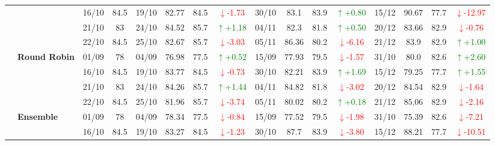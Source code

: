 {\begin{longtable}{llcc|cccc|cccc|cccc}
&
& 16/10 & 84.5 & 19/10 & 82.77 & 84.5 & \textcolor{red}{\(\downarrow\)-1.73} & 30/10 & 83.1 & 83.9 & \textcolor{green}{\(\uparrow\)+0.80} & 15/12 & 90.67 & 77.7 & \textcolor{red}{\(\downarrow\)-12.97} \\

&
& 21/10 & 83 & 24/10 & 84.52 & 85.7 & \textcolor{green}{\(\uparrow\)+1.18} & 04/11 & 82.3 & 81.8 & \textcolor{green}{\(\uparrow\)+0.50} & 20/12 & 83.66 & 82.9 & \textcolor{red}{\(\downarrow\)-0.76} \\

&
& 22/10 & 84.5 & 25/10 & 82.67 & 85.7 & \textcolor{red}{\(\downarrow\)-3.03} & 05/11 & 86.36 & 80.2 & \textcolor{red}{\(\downarrow\)-6.16} & 21/12 & 83.9 & 82.9 & \textcolor{green}{\(\uparrow\)+1.00} \\
\cmidrule(lr){2-16}


& \textbf{Round Robin}
& 01/09 & 78 & 04/09 & 76.98 & 77.5 & \textcolor{green}{\(\uparrow\)+0.52} & 15/09 & 77.93 & 79.5 & \textcolor{red}{\(\downarrow\)-1.57} & 31/10 & 80.0 & 82.6 & \textcolor{green}{\(\uparrow\)+2.60} \\

&
& 16/10 & 84.5 & 19/10 & 83.77 & 84.5 & \textcolor{red}{\(\downarrow\)-0.73} & 30/10 & 82.21 & 83.9 & \textcolor{green}{\(\uparrow\)+1.69} & 15/12 & 79.25 & 77.7 & \textcolor{green}{\(\uparrow\)+1.55} \\

&
& 21/10 & 83 & 24/10 & 84.26 & 85.7 & \textcolor{green}{\(\uparrow\)+1.44} & 04/11 & 84.82 & 81.8 & \textcolor{red}{\(\downarrow\)-3.02} & 20/12 & 84.54 & 82.9 & \textcolor{red}{\(\downarrow\)-1.64} \\

&
& 22/10 & 84.5 & 25/10 & 81.96 & 85.7 & \textcolor{red}{\(\downarrow\)-3.74} & 05/11 & 80.02 & 80.2 & \textcolor{green}{\(\uparrow\)+0.18} & 21/12 & 85.06 & 82.9 & \textcolor{red}{\(\downarrow\)-2.16} \\
\cmidrule(lr){2-16}




& \textbf{Ensemble}
& 01/09 & 78 & 04/09 & 78.34 & 77.5 & \textcolor{red}{\(\downarrow\)-0.84} & 15/09 & 77.52 & 79.5 & \textcolor{red}{\(\downarrow\)-1.98} & 31/10 & 75.39 & 82.6 & \textcolor{red}{\(\downarrow\)-7.21} \\

&
& 16/10 & 84.5 & 19/10 & 83.27 & 84.5 & \textcolor{red}{\(\downarrow\)-1.23} & 30/10 & 87.7 & 83.9 & \textcolor{red}{\(\downarrow\)-3.80} & 15/12 & 88.21 & 77.7 & \textcolor{red}{\(\downarrow\)-10.51} \\


\end{longtable}}
